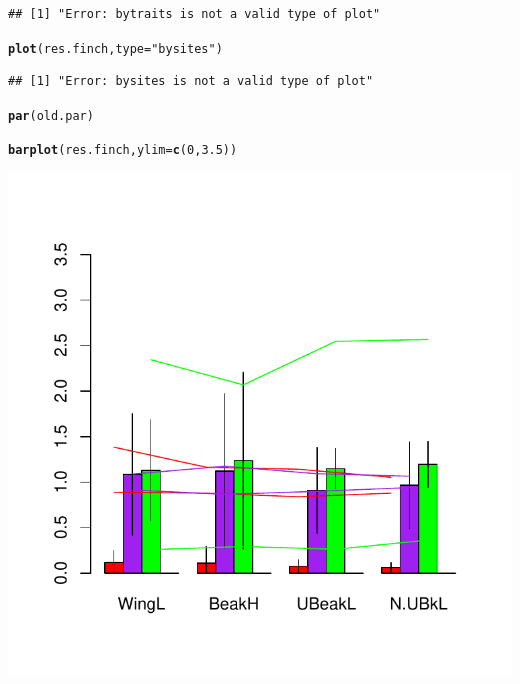 \documentclass[12pt]{article}\usepackage[]{graphicx}\usepackage[]{color}
\makeatletter
\def\maxwidth{ %
  \ifdim\Gin@nat@width>\linewidth
    \linewidth
  \else
    \Gin@nat@width
  \fi
}
\newcommand{\hlnum}[1]{\textcolor[rgb]{0.686,0.059,0.569}{#1}}%
\newcommand{\hlstr}[1]{\textcolor[rgb]{0.192,0.494,0.8}{#1}}%
\newcommand{\hlstd}[1]{\textcolor[rgb]{0.345,0.345,0.345}{#1}}%
\newcommand{\hlkwc}[1]{\textcolor[rgb]{0.333,0.667,0.333}{#1}}%
\newcommand{\hlkwd}[1]{\textcolor[rgb]{0.737,0.353,0.396}{\textbf{#1}}}%
\newenvironment{kframe}{%
 \def\at@end@of@kframe{}%
 \ifinner\ifhmode%
  \def\at@end@of@kframe{\end{minipage}}%
  \begin{minipage}{\columnwidth}%
 \fi\fi%
 \def\FrameCommand##1{\hskip\@totalleftmargin \hskip-\fboxsep
 \colorbox{shadecolor}{##1}\hskip-\fboxsep
     \hskip-\linewidth \hskip-\@totalleftmargin \hskip\columnwidth}%
 \MakeFramed {\advance\hsize-\width
   \@totalleftmargin\z@ \linewidth\hsize
   \@setminipage}}%
 {\par\unskip\endMakeFramed%
 \at@end@of@kframe}
\newenvironment{knitrout}{}{} %
\makeatother
\begin{document}
\begin{knitrout}
{}


\begin{kframe}\begin{verbatim}
## [1] "Error: bytraits is not a valid type of plot"
\end{verbatim}
\begin{alltt}
\hlkwd{plot}\hlstd{(res.finch,} \hlkwc{type}\hlstd{=}\hlstr{"bysites"}\hlstd{)}
\end{alltt}
\begin{verbatim}
## [1] "Error: bysites is not a valid type of plot"
\end{verbatim}
\begin{alltt}
\hlkwd{par}\hlstd{(old.par)}
\end{alltt}
\end{kframe}
\end{knitrout}

\newpage

\begin{knitrout}
\color{fgcolor}\begin{kframe}
\begin{alltt}
\hlkwd{barplot}\hlstd{(res.finch,} \hlkwc{ylim}\hlstd{=}\hlkwd{c}\hlstd{(}\hlnum{0}\hlstd{,}\hlnum{3.5}\hlstd{))}
\end{alltt}
\end{kframe}

{\centering \includegraphics[width=\maxwidth]{figure/unnamed-chunk-31} 

}



\end{knitrout}
\end{document}
